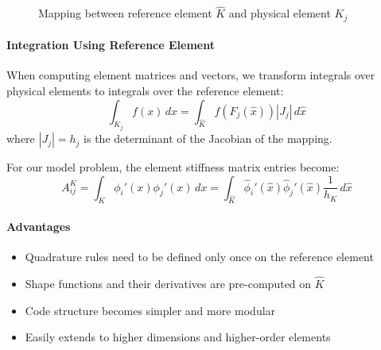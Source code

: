 \begin{figure}[H]
  \centering
  \caption{Mapping between reference element $\hat{K}$ and physical element $K_j$}
\end{figure}

\paragraph{Integration Using Reference Element}
When computing element matrices and vectors, we transform integrals over physical elements to integrals over the reference element:
\[
  \int_{K_j} f(x)\,dx = \int_{\hat{K}} f(F_j(\hat{x}))|J_j|\,d\hat{x}
\]
where $|J_j| = h_j$ is the determinant of the Jacobian of the mapping.

For our model problem, the element stiffness matrix entries become:
\[
  A_{ij}^K = \int_{K} \phi_i'(x)\phi_j'(x)\,dx = \int_{\hat{K}} \hat{\phi}_i'(\hat{x})\hat{\phi}_j'(\hat{x})\frac{1}{h_K}\,d\hat{x}
\]


\paragraph{Advantages}
\begin{itemize}
  \item Quadrature rules need to be defined only once on the reference element
  \item Shape functions and their derivatives are pre-computed on $\hat{K}$
  \item Code structure becomes simpler and more modular
  \item Easily extends to higher dimensions and higher-order elements
\end{itemize}


